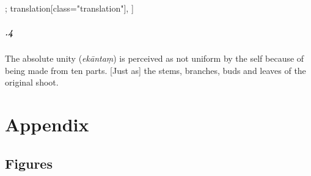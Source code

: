 \begin{alignment}[
  texts=edition[class="edition"];
  translation[class="translation"],
  ]
\begin{translation}
\begin{tlate}[21_4]
\paragraph{.4} The absolute unity (\textit{ekāntaṃ}) is perceived as not uniform by the self because of being made from ten parts. [Just as] the stems, branches, buds and leaves of the original shoot.
\flushpage 
\end{tlate}
\end{translation}
\end{alignment}
\pagebreak %
\chapter{Appendix}
\section{Figures}

